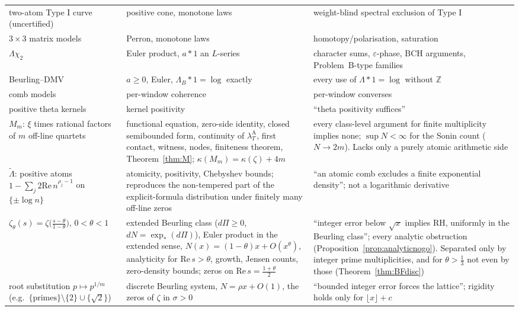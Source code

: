 \documentclass[11pt]{amsart}
\theoremstyle{definition}
\theoremstyle{remark}
\newcommand{\Z}{\mathbb Z}
\newcommand{\Rel}{\mathrm{Re}\,}
\newcommand{\lamA}{\lambda^{\mathrm A}_T}
\begin{document}
\begin{table}[ht]
\begin{tabularx}{\textwidth}{@{}p{3.3cm}p{4.0cm}Y@{}}
two-atom Type I curve (uncertified) & positive cone, monotone laws & weight-blind spectral exclusion of Type I \\
$3\times3$ matrix models & Perron, monotone laws & homotopy/polarisation, saturation \\
$\Lambda\chi_2$ & Euler product, $a*1$ an $L$-series & character sums, $\varepsilon$-phase, BCH arguments, Problem~B-type families \\
Beurling--DMV & $a\ge0$, Euler, $\Lambda_B*1=\log$ exactly & every use of $\Lambda*1=\log$ without $\Z$ \\
comb models & per-window coherence & per-window converses \\
positive theta kernels & kernel positivity & ``theta positivity suffices'' \\
$M_m$: $\xi$ times rational factors of $m$ off-line quartets & functional equation, zero-side identity, closed semibounded form, continuity of $\lamA$, first contact, witness, nodes, finiteness theorem, Theorem~\ref{thm:M}; $\kappa(M_m)=\kappa(\zeta)+4m$ & every class-level argument for finite multiplicity implies none; $\sup N<\infty$ for the Sonin count ($N\to2m$). Lacks only a purely atomic arithmetic side \\
$\tilde\Lambda$: positive atoms $1-\sum_j2\mathrm{Re}\,n^{\rho_j-1}$ on $\{\pm\log n\}$ & atomicity, positivity, Chebyshev bounds; reproduces the non-tempered part of the explicit-formula distribution under finitely many off-line zeros & ``an atomic comb excludes a finite exponential density''; not a logarithmic derivative \\
$\zeta_\theta(s)=\zeta\bigl(\frac{s-\theta}{1-\theta}\bigr)$, $0<\theta<1$ \cite[\S6.1]{Broucke2024} & extended Beurling class ($d\Pi\ge0$, $dN=\exp_*(d\Pi)$), Euler product in the extended sense, $N(x)=(1-\theta)x+O(x^\theta)$, analyticity for $\Rel s>\theta$, growth, Jensen counts, zero-density bounds; zeros on $\Rel s=\frac{1+\theta}2$ & ``integer error below $\sqrt x$ implies RH, uniformly in the Beurling class''; every analytic obstruction (Proposition~\ref{prop:analyticnogo}). Separated only by integer prime multiplicities, and for $\theta>\frac13$ not even by those (Theorem~\ref{thm:BFdisc}) \\
root substitution $p\mapsto p^{1/m}$ (e.g.\ $\{\text{primes}\}\setminus\{2\}\cup\{\sqrt2\}$) & discrete Beurling system, $N=\rho x+O(1)$, the zeros of $\zeta$ in $\sigma>0$ & ``bounded integer error forces the lattice''; rigidity holds only for $\lfloor x\rfloor+c$ \\

\end{tabularx}
\end{table}
\end{document}
